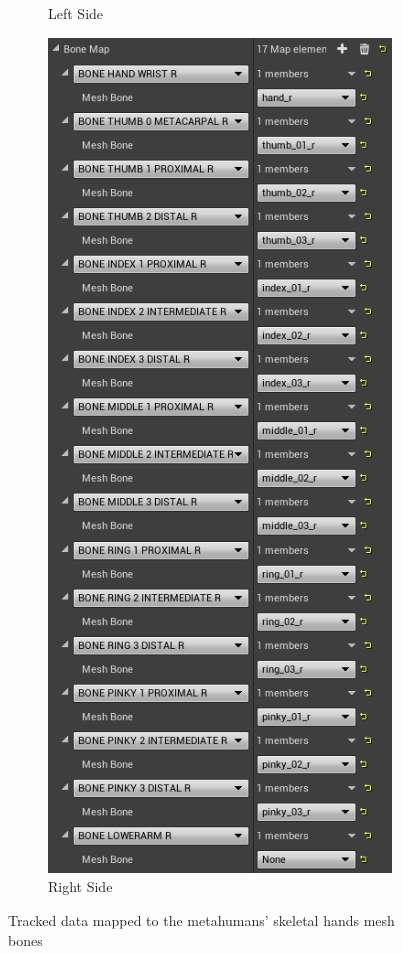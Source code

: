 \begin{figure}[!htb]
\begin{minipage}{\linewidth}
\begin{subfigure}{0.49\textwidth}
            \caption{Left Side}
        \end{subfigure}
        \begin{subfigure}{0.49\textwidth}
            \includegraphics[width=\textwidth]{figures/mappedBonesR.png}
            \centering
            \caption{Right Side}
        \end{subfigure}
        \caption{Tracked data mapped to the metahumans' skeletal hands mesh bones}
        \label{fig:mappedBones}
	\end{minipage}
\end{figure}

